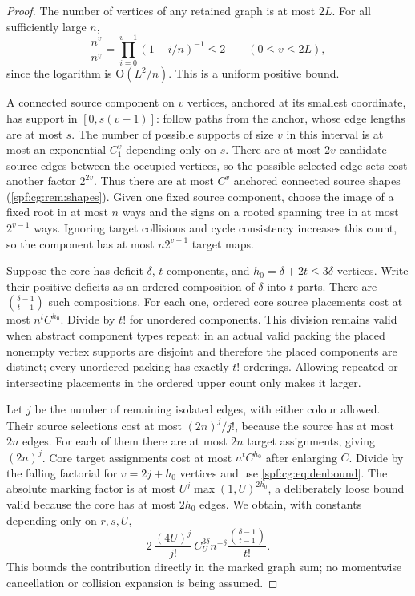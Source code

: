 \documentclass[11pt]{article}
\numberwithin{equation}{section}
\theoremstyle{definition}
\theoremstyle{remark}
\theoremstyle{definition}
\newcommand{\fall}[2]{{#1}^{\underline{#2}}}
\newcommand{\bigO}{\mathrm O}
\begin{document}
\begin{proof}
The number of vertices of any retained graph is at most $2L$. For all
sufficiently large $n$,
\begin{equation}
 \frac{n^v}{\fall nv}=\prod_{i=0}^{v-1}(1-i/n)^{-1}\le2
 \qquad(0\le v\le2L),
 \label{spf:cg:eq:denbound}
\end{equation}
since the logarithm is $\bigO(L^2/n)$. This is a uniform positive bound.

A connected source component on $v$ vertices, anchored at its smallest
coordinate, has support in $[0,s(v-1)]$: follow paths from the anchor, whose
edge lengths are at most $s$. The number of possible supports of size $v$
in this interval is at most an exponential $C_1^v$ depending only on $s$.
There are at most $2v$ candidate source edges between the occupied vertices,
so the possible selected edge sets cost another factor $2^{2v}$. Thus there
are at most $C^v$ anchored connected source shapes (\cref{spf:cg:rem:shapes}).
Given one fixed source component, choose the image of a fixed root in at most
$n$ ways and the signs on a rooted spanning tree in at most $2^{v-1}$ ways.
Ignoring target collisions and cycle consistency increases this count, so the
component has at most $n2^{v-1}$ target maps.

Suppose the core has deficit $\delta$, $t$ components, and
$h_0=\delta+2t\le3\delta$ vertices. Write their positive deficits as an
ordered composition of $\delta$ into $t$ parts. There are
$\binom{\delta-1}{t-1}$ such compositions. For each one, ordered core source
placements cost at most $n^tC^{h_0}$. Divide by $t!$ for unordered
components. This division remains valid when abstract component types
repeat: in an actual valid packing the placed nonempty vertex supports are
disjoint and therefore the placed components are distinct; every unordered
packing has exactly $t!$ orderings. Allowing repeated or intersecting
placements in the ordered upper count only makes it larger.

Let $j$ be the number of remaining isolated edges, with either colour
allowed. Their source selections cost at most $(2n)^j/j!$, because the
source has at most $2n$ edges. For each of them there are at most $2n$
target assignments, giving $(2n)^j$. Core target assignments cost at most
$n^tC^{h_0}$ after enlarging $C$. Divide by the falling factorial for
$v=2j+h_0$ vertices and use \eqref{spf:cg:eq:denbound}. The absolute marking
factor is at most $U^j\max(1,U)^{2h_0}$, a deliberately loose bound valid
because the core has at most $2h_0$ edges. We obtain, with constants
depending only on $r,s,U$,
\begin{equation}
 2\,\frac{(4U)^j}{j!}\,
 C_U^{3\delta}n^{-\delta}
 \frac{\binom{\delta-1}{t-1}}{t!}.
 \label{spf:cg:eq:sectorbound}
\end{equation}
This bounds the contribution directly in the marked graph sum; no
momentwise cancellation or collision expansion is being assumed.


\end{proof}
\end{document}
